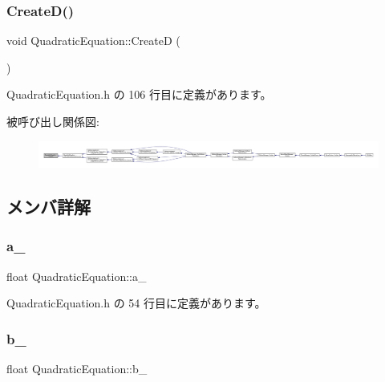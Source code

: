\subsubsection{\texorpdfstring{Create\+D()}{CreateD()}}
{\footnotesize\ttfamily void Quadratic\+Equation\+::\+CreateD (\begin{DoxyParamCaption}{ }\end{DoxyParamCaption})\hspace{0.3cm}{\ttfamily [inline]}}



 Quadratic\+Equation.\+h の 106 行目に定義があります。

被呼び出し関係図\+:
\nopagebreak
\begin{figure}[H]
\begin{center}
\leavevmode
\includegraphics[width=350pt]{class_quadratic_equation_a52f73bed0b665bcf3ab827630b999762_icgraph}
\end{center}
\end{figure}


\subsection{メンバ詳解}
\mbox{\label{class_quadratic_equation_ac12480b2ea372fab869fc304dd11a235}} 
\subsubsection{\texorpdfstring{a\+\_\+}{a\_}}
{\footnotesize\ttfamily float Quadratic\+Equation\+::a\+\_\+}



 Quadratic\+Equation.\+h の 54 行目に定義があります。

\mbox{\label{class_quadratic_equation_a874a04dff517be713157e6e97cb5512e}} 
\subsubsection{\texorpdfstring{b\+\_\+}{b\_}}
{\footnotesize\ttfamily float Quadratic\+Equation\+::b\+\_\+}



